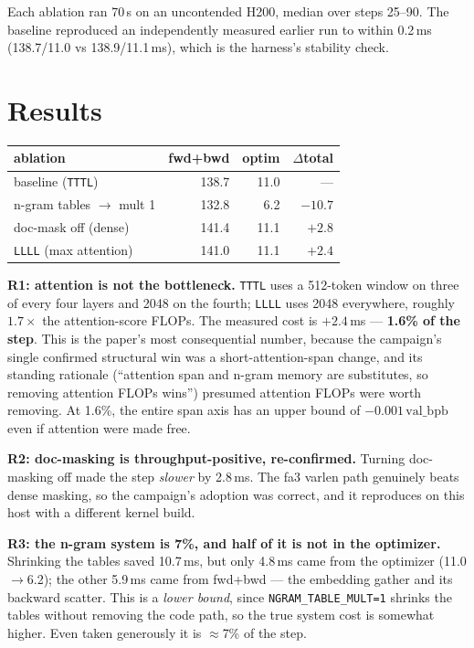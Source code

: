 \documentclass{article}
\newcommand{\vb}{\mathrm{val\_bpb}}
\begin{document}
Each ablation ran 70\,s on an uncontended H200, median over steps 25--90. The baseline reproduced an independently measured earlier run to within 0.2\,ms (138.7/11.0 vs 138.9/11.1\,ms), which is the harness's stability check.

\section{Results}
\begin{center}\begin{small}
\begin{tabular}{lrrr}
\toprule
ablation & fwd+bwd & optim & $\Delta$total \\
\midrule
baseline (\texttt{TTTL}) & 138.7 & 11.0 & --- \\
n-gram tables $\to$ mult 1 & 132.8 & 6.2 & $-10.7$ \\
doc-mask off (dense) & 141.4 & 11.1 & $+2.8$ \\
\texttt{LLLL} (max attention) & 141.0 & 11.1 & $+2.4$ \\
\bottomrule
\end{tabular}
\end{small}\end{center}

\textbf{R1: attention is not the bottleneck.} \texttt{TTTL} uses a 512-token window on three of every four layers and 2048 on the fourth; \texttt{LLLL} uses 2048 everywhere, roughly $1.7\times$ the attention-score FLOPs. The measured cost is $+2.4$\,ms --- \textbf{1.6\% of the step}. This is the paper's most consequential number, because the campaign's single confirmed structural win was a short-attention-span change, and its standing rationale (``attention span and n-gram memory are substitutes, so removing attention FLOPs wins'') presumed attention FLOPs were worth removing. At 1.6\%, the entire span axis has an upper bound of $-0.001$\,$\vb$ even if attention were made free.

\textbf{R2: doc-masking is throughput-positive, re-confirmed.} Turning doc-masking off made the step \emph{slower} by 2.8\,ms. The fa3 varlen path genuinely beats dense masking, so the campaign's adoption was correct, and it reproduces on this host with a different kernel build.

\textbf{R3: the n-gram system is 7\%, and half of it is not in the optimizer.} Shrinking the tables saved 10.7\,ms, but only 4.8\,ms came from the optimizer (11.0$\to$6.2); the other 5.9\,ms came from fwd+bwd --- the embedding gather and its backward scatter. This is a \emph{lower bound}, since \texttt{NGRAM\_TABLE\_MULT=1} shrinks the tables without removing the code path, so the true system cost is somewhat higher. Even taken generously it is $\approx$7\% of the step.
\end{document}
